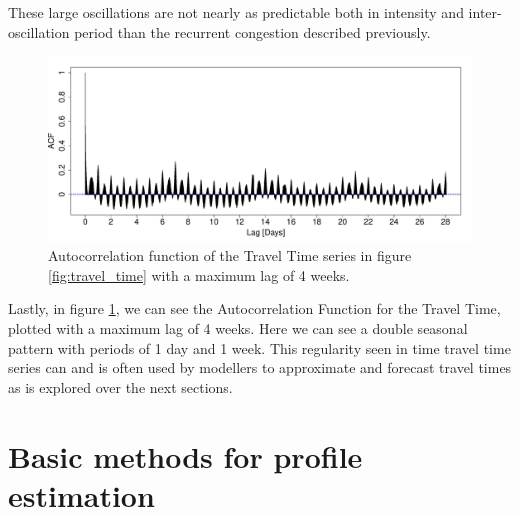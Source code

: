 \documentclass[a4paper, 10pt, conference]{ieeeconf}      %
\begin{document}
These large oscillations are not nearly as predictable both in intensity and inter-oscillation period than the recurrent congestion described previously.
\begin{figure}[htbp]
	\centerline{\includegraphics[width=\linewidth]{./images/ACF_M6_Link3.pdf}}
	\caption{Autocorrelation function of the Travel Time series in figure \ref{fig:travel_time} with a maximum lag of 4 weeks.}
	\label{fig:ACF}
\end{figure}
Lastly, in figure \ref{fig:ACF}, we can see the Autocorrelation Function for the Travel Time, plotted with a maximum lag of 4 weeks. Here we can see a double seasonal pattern with periods of 1 day and 1 week.
This regularity seen in time travel time series can and is often used by modellers to approximate and forecast travel times as is explored over the next sections.
\section{Basic methods for profile estimation}\label{Basic methods for profile estimation}
\end{document}
